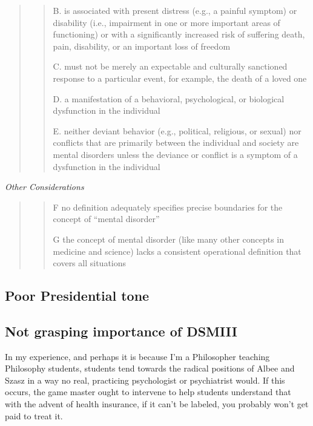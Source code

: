 \begin{refsection}
\begin{quote}
\begin{quote}
B. is associated with present distress (e.g., a painful symptom) or disability (i.e., impairment in one or more important areas of functioning) or with a significantly increased risk of suffering death, pain, disability, or an important loss of freedom

C. must not be merely an expectable and culturally sanctioned response to a particular event, for example, the death of a loved one

D. a manifestation of a behavioral, psychological, or biological dysfunction in the individual

E. neither deviant behavior (e.g., political, religious, or sexual) nor conflicts that are primarily between the individual and society are mental disorders unless the deviance or conflict is a symptom of a dysfunction in the individual
\end{quote}
\end{quote}

\emph{Other Considerations}

\begin{quote}

\begin{quote}

F no definition adequately specifies precise boundaries for the concept of “mental disorder”

G the concept of mental disorder (like many other concepts in medicine and science) lacks a consistent operational definition that covers all situations
\end{quote}
\end{quote}

\subsection{Poor Presidential tone}
\label{poorpresidentialtone}

\subsection{Not grasping importance of DSMIII}
\label{notgraspingimportanceofdsmiii}

In my experience, and perhaps it is because I'm a Philosopher teaching Philosophy students, students tend towards the radical positions of Albee and Szasz in a way no real, practicing psychologist or psychiatrist would. If this occurs, the game master ought to intervene to help students understand that with the advent of health insurance, if it can't be labeled, you probably won't get paid to treat it.


\end{refsection}
